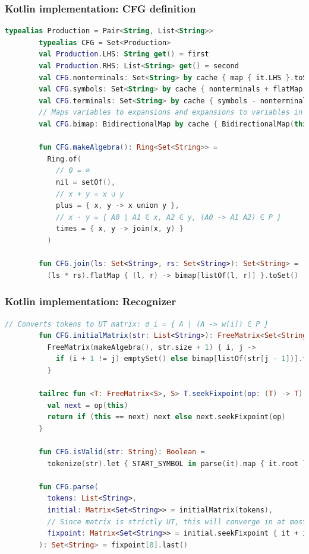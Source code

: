 \documentclass{beamer}
\begin{document}
    \begin{frame}[fragile]
        \frametitle{Kotlin implementation: CFG definition}
        \begin{lstlisting}[language=Kotlin, gobble=8, basicstyle=\scriptsize\ttfamily]
        typealias Production = Pair<String, List<String>>
        typealias CFG = Set<Production>
        val Production.LHS: String get() = first
        val Production.RHS: List<String> get() = second
        val CFG.nonterminals: Set<String> by cache { map { it.LHS }.toSet() }
        val CFG.symbols: Set<String> by cache { nonterminals + flatMap { it.RHS } }
        val CFG.terminals: Set<String> by cache { symbols - nonterminals }
        // Maps variables to expansions and expansions to variables in a CFG
        val CFG.bimap: BidirectionalMap by cache { BidirectionalMap(this) }

        fun CFG.makeAlgebra(): Ring<Set<String>> =
          Ring.of(
            // 0 = ∅
            nil = setOf(),
            // x + y = x ∪ y
            plus = { x, y -> x union y },
            // x · y = { A0 | A1 ∈ x, A2 ∈ y, (A0 -> A1 A2) ∈ P }
            times = { x, y -> join(x, y) }
          )

        fun CFG.join(ls: Set<String>, rs: Set<String>): Set<String> =
          (ls * rs).flatMap { (l, r) -> bimap[listOf(l, r)] }.toSet()
        \end{lstlisting}
    \end{frame}

    \begin{frame}[fragile]
        \frametitle{Kotlin implementation: Recognizer}
        \begin{lstlisting}[language=Kotlin, gobble=8, basicstyle=\scriptsize\ttfamily]
        // Converts tokens to UT matrix: σ_i = { A | (A -> w[i]) ∈ P }
        fun CFG.initialMatrix(str: List<String>): FreeMatrix<Set<String>> =
          FreeMatrix(makeAlgebra(), str.size + 1) { i, j ->
            if (i + 1 != j) emptySet() else bimap[listOf(str[j - 1])].toSet()
          }

        tailrec fun <T: FreeMatrix<S>, S> T.seekFixpoint(op: (T) -> T): T {
          val next = op(this)
          return if (this == next) next else next.seekFixpoint(op)
        }

        fun CFG.isValid(str: String): Boolean =
          tokenize(str).let { START_SYMBOL in parse(it).map { it.root } }

        fun CFG.parse(
          tokens: List<String>,
          initial: Matrix<Set<String>> = initialMatrix(tokens),
          // Since matrix is strictly UT, this will converge in at most n steps
          fixpoint: Matrix<Set<String>> = initial.seekFixpoint { it + it * it }
        ): Set<String> = fixpoint[0].last()
        \end{lstlisting}
    \end{frame}
\end{document}
